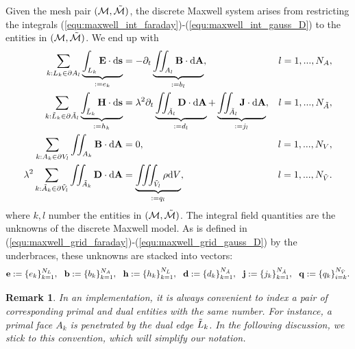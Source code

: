 \documentclass{article}
\newtheorem*{remark}{Remark}
\begin{document}
Given the mesh pair $(\mathcal{M}, \Tilde{\mathcal{M}})$, the discrete Maxwell system
arises from restricting the integrals
(\ref{equ:maxwell_int_faraday})-(\ref{equ:maxwell_int_gauss_D}) to the entities in
$(\mathcal{M}, \Tilde{\mathcal{M}})$. We end up with
\begin{subequations}
\begin{align}
    \sum_{k:L_k\in\partial A_l} \underbrace{\int_{L_k} \mathbf{E} \cdot \text{d}\mathbf{s}}_{:= e_k} &= - {\partial_t} \underbrace{\iint_{A_l} \mathbf{B} \cdot \text{d}\mathbf{A}}_{:= b_l},&l = 1,...,N_A, \label{equ:maxwell_grid_faraday} \\
    \sum_{k:\Tilde{L}_k\in\partial \Tilde{A}_l} \underbrace{\int_{\Tilde{L}_k} \mathbf{H} \cdot \text{d}\mathbf{s}}_{:= h_k} &= \lambda^2{\partial_t} \underbrace{\iint_{\Tilde{A}_l} \mathbf{D} \cdot \text{d}\mathbf{A}}_{:= d_l} + \underbrace{\iint_{\Tilde{A}_l} \mathbf{J} \cdot \text{d}\mathbf{A}}_{:= j_l}, &l = 1,...,N_{\Tilde{A}}, \label{equ:maxwell_grid_ampere}\\
    \sum_{k:A_k\in \partial V_l} \iint_{A_k} \mathbf{B} \cdot \text{d}\mathbf{A} &= 0,&l = 1,..., N_V,\label{equ:maxwell_grid_gauss_B}\\
    \lambda^2\sum_{k:\Tilde{A}_k \in \partial\Tilde{V}_l}\iint_{\Tilde{A}_k} \mathbf{D} \cdot \text{d}\mathbf{A} &= \underbrace{\iiint_{\Tilde{V}_l} \rho \text{d}V}_{:= q_l},&l = 1,...,N_{\Tilde{V}}. \label{equ:maxwell_grid_gauss_D}
\end{align}
\end{subequations}
where $k, l$ number the entities in $(\mathcal{M}, \Tilde{\mathcal{M}})$.  The integral
field quantities are the unknowns of the discrete Maxwell model. As is defined in
(\ref{equ:maxwell_grid_faraday})-(\ref{equ:maxwell_grid_gauss_D}) by the underbraces,
these unknowns are stacked into vectors:
\begin{equation}
  \label{equ:fit_scale_vector}
  \mathbf{e} := \{e_k\}_{k=1}^{N_L},\ \ \mathbf{b} := \{b_k\}_{k=1}^{N_A}, \ \ \mathbf{h} := \{h_k\}_{k=1}^{N_{\Tilde{L}}}, \ \ \mathbf{d} := \{d_k\}_{k=1}^{N_{\Tilde{A}}}, \ \ \mathbf{j} := \{j_k\}_{k=1}^{N_{\Tilde{A}}}, \ \ \mathbf{q} := \{q_k\}_{i=k}^{N_{\Tilde{V}}}.
\end{equation}

\begin{remark}
    In an implementation, it is always convenient to index a pair of corresponding primal and dual entities with the same number. For instance, a primal face $A_k$ is penetrated by the dual edge $\Tilde{L}_k$. In the following discussion, we stick to this convention, which will simplify our notation.
\end{remark}
\end{document}
